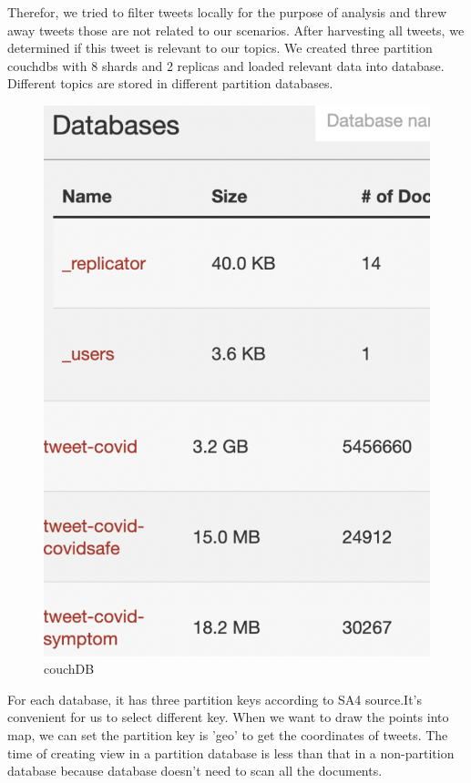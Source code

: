 Therefor, we tried to filter tweets locally for the purpose of analysis and threw away tweets those are not related to our scenarios. After harvesting all tweets, we determined if this tweet is relevant to our topics. We created three partition couchdbs with 8 shards and 2 replicas and loaded relevant data into database. Different topics are stored in different partition databases.

\begin{figure}[H]
    \centering
    \includegraphics[scale=0.4]{city_analytics/report/images/couchdb.png}
    \caption{couchDB}
    \label{fig:my_label}
\end{figure}

For each database, it has three partition keys according to SA4 source.It's convenient for us to select different key. When we want to draw the points into map, we can set the partition key is 'geo' to get the coordinates of tweets. The time of creating view in a partition database is less than that in a non-partition database because database doesn't need to scan all the documents. 

